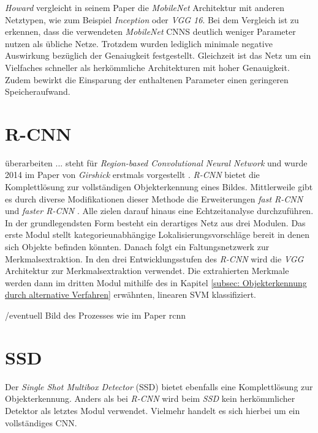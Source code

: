 		\textit{Howard} vergleicht in seinem Paper die \textit{MobileNet} Architektur mit anderen Netztypen, wie zum Beispiel \textit{Inception} oder \textit{VGG 16}. Bei dem Vergleich ist zu erkennen, dass die verwendeten \textit{MobileNet} CNNS deutlich weniger Parameter nutzen als übliche Netze. Trotzdem wurden lediglich minimale negative Auswirkung bezüglich der Genaiugkeit festgestellt. Gleichzeit ist das Netz um ein Vielfaches schneller als herkömmliche Architekturen mit hoher Genauigkeit. Zudem bewirkt die Einsparung der enthaltenen Parameter einen geringeren Speicheraufwand.
		
	
		\section*{R-CNN}
		überarbeiten
		...  steht für \textit{Region-based Convolutional Neural Network} und wurde 2014 im Paper von \textit{Girshick} erstmals vorgestellt \cite{rcnn}. \textit{R-CNN} bietet die Komplettlösung zur vollständigen Objekterkennung eines Bildes. Mittlerweile gibt es durch diverse Modifikationen dieser Methode die Erweiterungen \textit{fast R-CNN} und \textit{faster R-CNN} \cite{fastrcnn} \cite{fasterrcnn}. Alle zielen darauf hinaus eine Echtzeitanalyse durchzuführen.\\
		
		In der grundlegendsten Form besteht ein derartiges Netz aus drei Modulen. Das erste Modul stellt kategorieunabhängige Lokalisierungsvorschläge bereit in denen sich Objekte befinden könnten. Danach folgt ein Faltungsnetzwerk zur Merkmalsextraktion. In den drei Entwicklungsstufen des \textit{R-CNN} wird die \textit{VGG} Architektur zur Merkmalsextraktion verwendet. Die extrahierten Merkmale werden dann im dritten Modul mithilfe des in Kapitel \ref{subsec: Objekterkennung durch alternative Verfahren} erwähnten, linearen SVM klassifiziert.
		
		/eventuell Bild des Prozesses wie im Paper rcnn
		
		\section*{SSD}
		
		Der \textit{Single Shot Multibox Detector} (SSD) bietet ebenfalls eine Komplettlösung zur Objekterkennung. Anders als bei \textit{R-CNN} wird beim \textit{SSD} kein herkömmlicher Detektor als letztes Modul verwendet. Vielmehr handelt es sich hierbei um ein vollständiges CNN.\\
		
